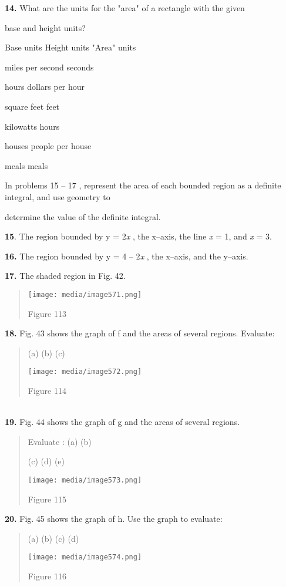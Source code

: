 \textbf{14.} What are the units for the "area" of a rectangle with the
given

base and height units?

Base units Height units "Area" units

miles per second seconds

hours dollars per hour

square feet feet

kilowatts hours

houses people per house

meals meals

In problems 15 -- 17 , represent the area of each bounded region as a
definite integral, and use geometry to

determine the value of the definite integral.

\textbf{15}. The region bounded by y = 2\emph{x} , the x--axis, the line
\emph{x} = 1, and \emph{x} = 3.

\textbf{16.} The region bounded by y = 4 -- 2\emph{x} , the x--axis, and
the y--axis.

\textbf{17.} The shaded region in Fig. 42.

\begin{quote}
\texttt{[image: media/image571.png]}

Figure 113
\end{quote}

\textbf{18.} Fig. 43 shows the graph of f and the areas of several
regions. Evaluate:

\begin{quote}
(a) (b) (c)

\texttt{[image: media/image572.png]}

Figure 114
\end{quote}

\textbf{\\
19.} Fig. 44 shows the graph of g and the areas of several regions.

\begin{quote}
Evaluate : (a) (b)

(c) (d) (e)

\texttt{[image: media/image573.png]}

Figure 115
\end{quote}

\textbf{20.} Fig. 45 shows the graph of h. Use the graph to evaluate:

\begin{quote}
(a) (b) (c) (d)

\texttt{[image: media/image574.png]}

Figure 116
\end{quote}

